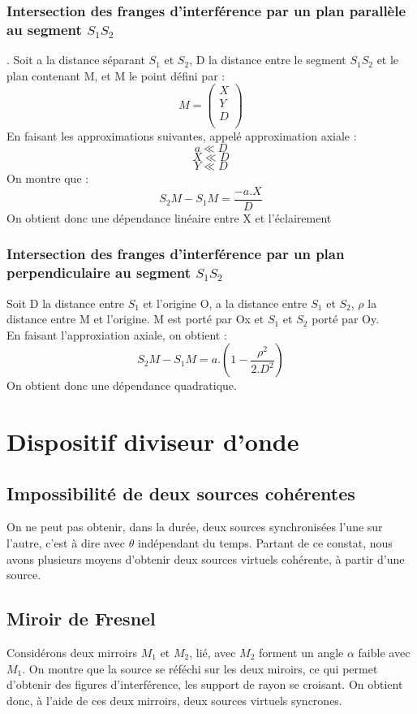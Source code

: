 \subsubsection{Intersection des franges d'interférence par un plan parallèle au segment $S_1S_2$}.
Soit a la distance séparant $S_1$ et $S_2$, D la distance entre le segment $S_1S_2$ et le plan contenant M, et M le point défini par : 
$$M = \begin{pmatrix}
       X \\
       Y \\
       D \\
      \end{pmatrix}
$$
En faisant les approximations suivantes, appelé approximation axiale : 
$$a \ll D$$
$$X \ll D$$
$$Y \ll D$$
On montre que :
$$S_2M - S_1M = \dfrac{-a.X}{D}$$
On obtient donc une dépendance linéaire entre X et l'éclairement
\subsubsection{Intersection des franges d'interférence par un plan perpendiculaire au segment $S_1S_2$}
Soit D la distance entre $S_1$ et l'origine O, a la distance entre $S_1$ et $S_2$, $\rho$ la distance entre M et l'origine. M est porté par Ox et $S_1$ et $S_2$ porté par Oy.\\
En faisant l'approxiation axiale, on obtient : 
$$S_2M - S_1M = a.(1 - \dfrac{\rho^2}{2.D^2})$$
On obtient donc une dépendance quadratique.
\section{Dispositif diviseur d'onde}
\subsection{Impossibilité de deux sources cohérentes}
On ne peut pas obtenir, dans la durée, deux sources synchronisées l'une sur l'autre, c'est à dire avec $\theta$ indépendant du temps. Partant de ce constat, nous avons plusieurs moyens d'obtenir deux sources virtuels cohérente, à partir d'une source.
\subsection{Miroir de Fresnel}
Considérons deux mirroirs $M_1$ et $M_2$, lié, avec $M_2$ forment un angle $\alpha$ faible avec $M_1$. On montre que la source se réféchi sur les deux miroirs, ce qui permet d'obtenir des figures d'interférence, les support de rayon se croisant. On obtient donc, à l'aide de ces deux mirroirs, deux sources virtuels syncrones.
